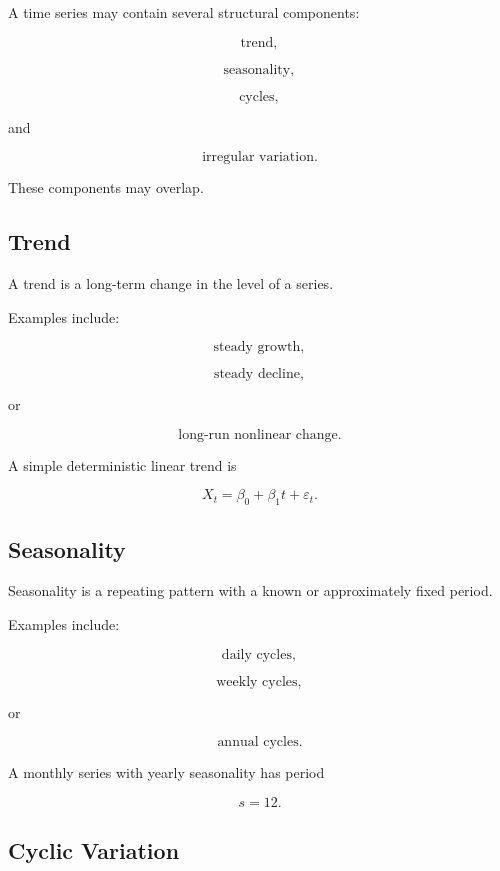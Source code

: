 A time series may contain several structural components:

\[
\boxed{
\text{trend},
}
\]

\[
\boxed{
\text{seasonality},
}
\]

\[
\boxed{
\text{cycles},
}
\]

and

\[
\boxed{
\text{irregular variation}.
}
\]

These components may overlap.

\subsection{Trend}
\label{subsec:time-series-trend}

A trend is a long-term change in the level of a series.

Examples include:

\[
\boxed{
\text{steady growth},
}
\]

\[
\boxed{
\text{steady decline},
}
\]

or

\[
\boxed{
\text{long-run nonlinear change}.
}
\]

A simple deterministic linear trend is

\[
\boxed{
X_t
=
\beta_0+\beta_1t+\varepsilon_t.
}
\]

\subsection{Seasonality}
\label{subsec:time-series-seasonality}

Seasonality is a repeating pattern with a known or approximately fixed
period.

Examples include:

\[
\boxed{
\text{daily cycles},
}
\]

\[
\boxed{
\text{weekly cycles},
}
\]

or

\[
\boxed{
\text{annual cycles}.
}
\]

A monthly series with yearly seasonality has period

\[
\boxed{
s=12.
}
\]

\subsection{Cyclic Variation}
\label{subsec:time-series-cycles}

